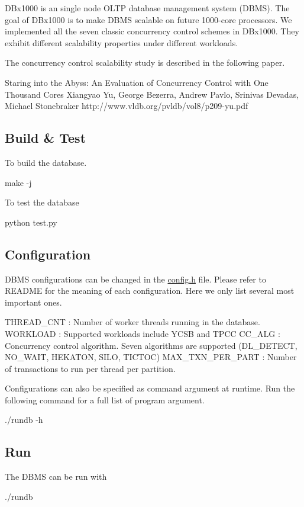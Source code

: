 D\+Bx1000 is an single node O\+L\+TP database management system (D\+B\+MS). The goal of D\+Bx1000 is to make D\+B\+MS scalable on future 1000-\/core processors. We implemented all the seven classic concurrency control schemes in D\+Bx1000. They exhibit different scalability properties under different workloads.

The concurrency control scalability study is described in the following paper. \begin{DoxyVerb}Staring into the Abyss: An Evaluation of Concurrency Control with One Thousand Cores
Xiangyao Yu, George Bezerra, Andrew Pavlo, Srinivas Devadas, Michael Stonebraker
http://www.vldb.org/pvldb/vol8/p209-yu.pdf
\end{DoxyVerb}


\subsection*{Build \& Test }

To build the database. \begin{DoxyVerb}make -j
\end{DoxyVerb}


To test the database \begin{DoxyVerb}python test.py
\end{DoxyVerb}


\subsection*{Configuration }

D\+B\+MS configurations can be changed in the \hyperlink{config_8h}{config.\+h} file. Please refer to R\+E\+A\+D\+ME for the meaning of each configuration. Here we only list several most important ones. \begin{DoxyVerb}THREAD_CNT        : Number of worker threads running in the database.
WORKLOAD          : Supported workloads include YCSB and TPCC
CC_ALG            : Concurrency control algorithm. Seven algorithms are supported 
                    (DL_DETECT, NO_WAIT, HEKATON, SILO, TICTOC) 
MAX_TXN_PER_PART  : Number of transactions to run per thread per partition.
\end{DoxyVerb}


Configurations can also be specified as command argument at runtime. Run the following command for a full list of program argument. \begin{DoxyVerb}./rundb -h
\end{DoxyVerb}


\subsection*{Run }

The D\+B\+MS can be run with \begin{DoxyVerb}./rundb\end{DoxyVerb}
 